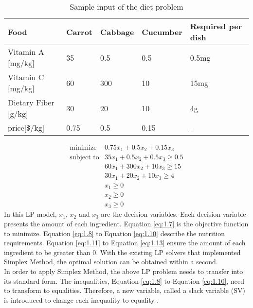 \begin{table} 
\begin{center}
\begin{tabular}{| l | l  l  l | l |}
\hline
Food & Carrot & Cabbage & Cucumber & Required per dish \\ \hline
Vitamin A [mg/kg] & 35 & 0.5 & 0.5 & 0.5mg \\ 
Vitamin C [mg/kg] & 60 & 300 & 10 & 15mg \\ 
Dietary Fiber [g/kg] & 30 & 20 & 10 & 4g \\ \hline
price[$\$$/kg] & 0.75 & 0.5 & 0.15 & - \\ \hline
\end{tabular} 
\end{center}
\caption{Sample input of the diet problem}
\label{tab:1.1}
\end{table}	

\begin{eqnarray} 
\text{minimize} & 0.75x_{1} + 0.5x_{2} +  0.15x_{3}  \label{eq:1.7} \\
\text{subject to} & 35x_{1} + 0.5x_{2} + 0.5x_{3} \geq 0.5 \label{eq:1.8} \\
& 60x_{1} + 300x_{2} + 10x_{3} \geq 15 \label{eq:1.9} \\
& 30x_{1} + 20x_{2} + 10x_{3} \geq 4 \label{eq:1.10} \\
& x_{1} \geq 0  \label{eq:1.11} \\
& x_{2} \geq 0  \label{eq:1.12} \\
& x_{3} \geq 0  \label{eq:1.13}
\end{eqnarray} 
In this LP model, $x_{1}$, $x_{2}$ and $x_{3}$ are the decision variables. Each decision variable presents the amount of each ingredient. Equation \ref{eq:1.7} is the objective function to minimize. Equation \ref{eq:1.8} to Equation \ref{eq:1.10} describe the nutrition requirements. Equation \ref{eq:1.11} to Equation \ref{eq:1.13} ensure the amount of each ingredient to be greater than 0. With the existing LP solvers that implemented Simplex Method, the optimal solution can be obtained within a second. \\

In order to apply Simplex Method, the above LP problem needs to transfer into its standard form. The inequalities, Equation \ref{eq:1.8} to Equation \ref{eq:1.10}, need to transform to equalities. Therefore, a new variable, called a slack variable (SV) is introduced to change each inequality to equality \cite{ConvexOptimization}. \\

